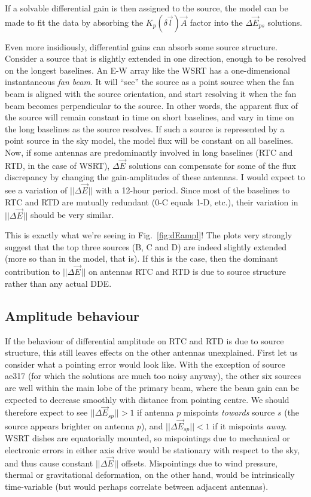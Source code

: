 \documentclass{aa}
\newcommand{\jones}[2]{\vec {#1}_{#2}}
\begin{document}
If a solvable differential gain is then assigned to the source, the model can be made to fit the data by absorbing the $K_{p}(\delta\vec l)\jones{A}{}$ factor into the $\Delta\jones{E}{ps}$ solutions.

Even more insidiously, differential gains can absorb some source structure. Consider a source that is slightly extended in one direction, enough to be resolved on the longest baselines. An E-W array like the WSRT has a one-dimensional instantaneous {\em fan beam}. It will ``see'' the source as a point source when the fan beam is aligned with the source orientation, and start resolving it when the fan beam becomes perpendicular to the source. In other words, the apparent flux of the source will remain constant in time on short baselines, and vary in time on the long baselines as the source resolves. If such a source is represented by a point source in the sky model, the model flux will be constant on all baselines. Now, if some antennas are predominantly involved in long baselines (RTC and RTD, in the case of WSRT), $\Delta\jones{E}{}$ solutions can compensate for some of the flux discrepancy by changing the gain-amplitudes of these antennas. I would expect to see a variation of $||\Delta\jones{E}{}||$ with a 12-hour period. Since most of the baselines to RTC and RTD are mutually redundant (0-C equals 1-D, etc.), their variation in $||\Delta\jones{E}{}||$ should be very similar. 

This is exactly what we're seeing in Fig.~\ref{fig:dEampl}! The plots very strongly suggest that the top three sources (B, C and D) are indeed slightly extended (more so than in the model, that is). If this is the case, then the dominant contribution to $||\Delta\jones{E}{}||$ on antennas RTC and RTD is due to source structure rather than any actual DDE. 

\subsection{Amplitude behaviour}

If the behaviour of differential amplitude on RTC and RTD is due to source structure, this still leaves effects on the other antennas unexplained. First let us consider what a pointing error would look like. With the exception of source ae317 (for which the solutions are much too noisy anyway), the other six sources are well within the main lobe of the primary beam, where the beam gain can be expected to decrease smoothly with distance from pointing centre. We should therefore expect to see $||\Delta\jones{E}{sp}||>1$ if antenna $p$ mispoints \emph{towards} source $s$ (the source appears brighter on antenna $p$), and $||\Delta\jones{E}{sp}||<1$ if it mispoints \emph{away}. WSRT dishes are equatorially mounted, so mispointings due to mechanical or electronic errors in either axis drive would be stationary with respect to the sky, and thus cause constant 
$||\Delta\jones{E}{}||$ offsets. Mispointings due to wind pressure, thermal or gravitational deformation, on the other hand, would be intrinsically time-variable (but would perhaps correlate between adjacent antennas).
\end{document}
